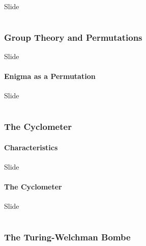 \documentclass[hyphens,aspectratio=169]{beamer}
\begin{document}
\begin{frame}[fragile]{Slide}
\end{frame}

\part{}

\section{Group Theory and Permutations}

\begin{frame}[fragile]{Slide}
\end{frame}

\subsection{Enigma as a Permutation}

\begin{frame}[fragile]{Slide}
\end{frame}

\part{}
\section{The Cyclometer}

\subsection{Characteristics}
\begin{frame}[fragile]{Slide}
\end{frame}

\subsection{The Cyclometer}
\begin{frame}[fragile]{Slide}
\end{frame}

\part{}
\section{The Turing-Welchman Bombe}
\end{document}
